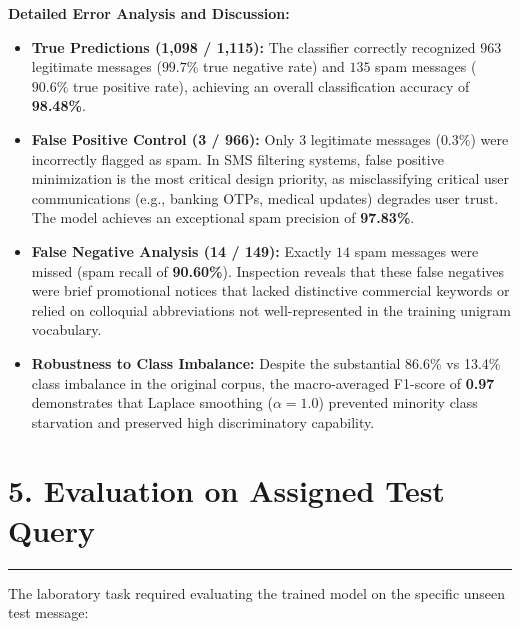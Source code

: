 \documentclass[11pt,a4paper]{article}
\begin{document}
\vspace{0.25cm}
\noindent\textbf{Detailed Error Analysis and Discussion:}
\begin{itemize}
    \setlength{\itemsep}{3pt}
    \item \textbf{True Predictions (1,098 / 1,115):} The classifier correctly recognized $963$ legitimate messages ($99.7\%$ true negative rate) and $135$ spam messages ($90.6\%$ true positive rate), achieving an overall classification accuracy of \textbf{98.48\%}.
    \item \textbf{False Positive Control (3 / 966):} Only $3$ legitimate messages ($0.3\%$) were incorrectly flagged as spam. In SMS filtering systems, false positive minimization is the most critical design priority, as misclassifying critical user communications (e.g., banking OTPs, medical updates) degrades user trust. The model achieves an exceptional spam precision of \textbf{97.83\%}.
    \item \textbf{False Negative Analysis (14 / 149):} Exactly $14$ spam messages were missed (spam recall of \textbf{90.60\%}). Inspection reveals that these false negatives were brief promotional notices that lacked distinctive commercial keywords or relied on colloquial abbreviations not well-represented in the training unigram vocabulary.
    \item \textbf{Robustness to Class Imbalance:} Despite the substantial 86.6\% vs 13.4\% class imbalance in the original corpus, the macro-averaged F1-score of \textbf{0.97} demonstrates that Laplace smoothing ($\alpha=1.0$) prevented minority class starvation and preserved high discriminatory capability.
\end{itemize}

\newpage

\section*{5. Evaluation on Assigned Test Query}
\noindent\rule{\textwidth}{0.5pt}\vspace{0.12cm}

The laboratory task required evaluating the trained model on the specific unseen test message:
\begin{center}
    \setlength{\fboxsep}{8pt}
\end{center}
\end{document}
